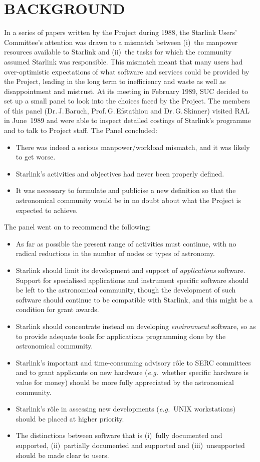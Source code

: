 \documentclass[nolof,11pt,noabs]{starlink}
\begin{document}
\scfrontmatter

\section{BACKGROUND}
In a series of papers written by the Project during 1988,
the Starlink Users' Committee's attention was drawn
to a mismatch between
(i)~the manpower resources available to Starlink and
(ii)~the tasks for
which the community
assumed Starlink was responsible.
This mismatch meant that many users had
over-optimistic expectations of what
software and services could be provided by the
Project, leading in the long term to inefficiency and waste
as well as disappointment and mistrust.  At its meeting in
February 1989, SUC decided to set up a small panel
to look into the choices faced by the Project.
The members of this panel
(Dr.\,J.\,Baruch, Prof.\,G.\,Efstathiou and
Dr.\,G.\,Skinner)
visited RAL in June~1989 and were able
to inspect detailed costings of Starlink's programme
and to talk to Project staff.  The Panel concluded:
\begin{itemize}
\item There was indeed a serious manpower/workload mismatch, and it was
likely to get worse.
\item Starlink's activities and objectives had never been properly defined.
\item It was necessary to formulate and publicise a new definition so
that the astronomical
community would be in no doubt about what the Project is expected to achieve.
\end{itemize}
The panel went on to recommend the following:
\begin{itemize}
\item As far as possible
the present range of activities must continue,
with no radical reductions in
the number of nodes or types of astronomy.
\item Starlink should limit its development and support
of \textit{applications} software.
Support for specialised
applications and instrument specific software
should be left to the astronomical community, though
the development of such software should continue to
be compatible with Starlink, and this might be a condition for
grant awards.
\item Starlink should concentrate instead on developing
\textit{environment} software, so as to provide adequate tools for
applications programming done by the
astronomical community.
\item Starlink's important and
time-consuming advisory r\^{o}le to
SERC committees and to grant applicants on new
hardware (\textit{e.g.}\ whether specific hardware
is value for money) should be more fully appreciated
by the astronomical community.
\item Starlink's r\^{o}le in assessing new
developments (\textit{e.g.}\ UNIX workstations)
should be placed at higher priority.
\item The distinctions between software that is
(i)~fully documented and supported, (ii)~partially
documented and supported and (iii)~unsupported
should be made clear to users.
\end{itemize}
\end{document}

